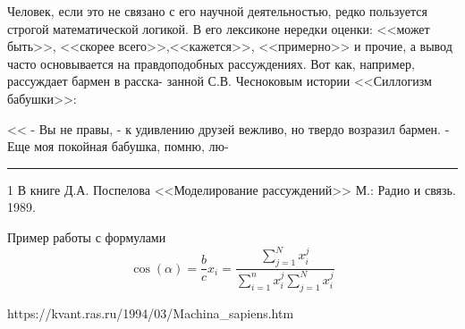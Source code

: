 \begin{minipage}{0.3\textwidth}
\hspace{0.1cm} Человек, если это не связано с его
научной деятельностью, редко пользуется строгой математической логикой. В его
лексиконе нередки оценки: <<может быть>>, <<скорее всего>>,<<кажется>>, <<примерно>> и прочие, а вывод часто основывается на правдоподобных рассуждениях. Вот как,
например, рассуждает бармен в расска-
занной С.В. Чесноковым истории <<Силлогизм бабушки>>:


\hspace{0.1cm} << - Вы не правы, - к удивлению друзей
вежливо, но твердо возразил бармен. -
Еще моя покойная бабушка, помню, лю-


\noindent\rule{2cm}{0.4pt}


\scriptsize
1 В книге Д.А. Поспелова <<Моделирование рассуждений>> М.: Радио и связь. 1989.
  

\end{minipage}


\vspace{1cm}
\begin{center}
Пример работы с формулами 
  \begin{displaymath}
    \cos (\alpha) = \frac {b}{c}

    x_{i} = \frac {\sum_{j=1}^N x^{j}_{i}}{\sum_{i=1}^n x^{j}_{i} \sum_{j=1}^N x^{j}_{i}}
  \end{displaymath}
\end{center}

\vspace{1cm}
\begin{center}
    https://kvant.ras.ru/1994/03/Machina_sapiens.htm
\end{center}